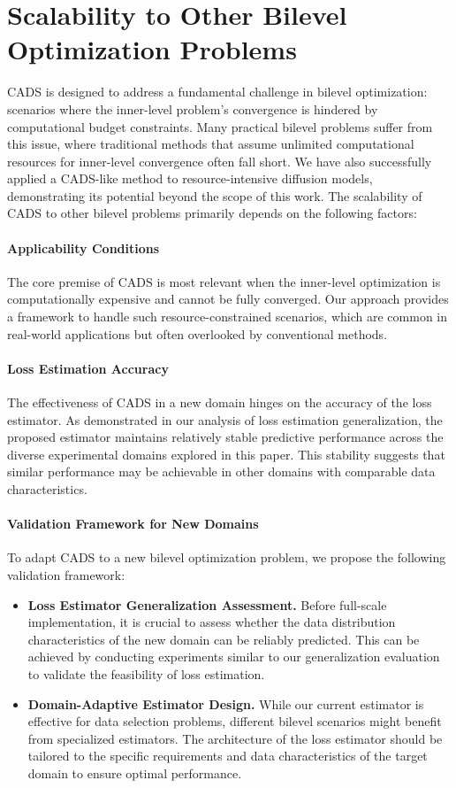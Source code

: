 \section{Scalability to Other Bilevel Optimization Problems}
\label{appendix:scala2other}
CADS is designed to address a fundamental challenge in bilevel optimization: scenarios where the inner-level problem's convergence is hindered by computational budget constraints. Many practical bilevel problems suffer from this issue, where traditional methods that assume unlimited computational resources for inner-level convergence often fall short. We have also successfully applied a CADS-like method to resource-intensive diffusion models, demonstrating its potential beyond the scope of this work. The scalability of CADS to other bilevel problems primarily depends on the following factors:

\paragraph{Applicability Conditions}
The core premise of CADS is most relevant when the inner-level optimization is computationally expensive and cannot be fully converged. Our approach provides a framework to handle such resource-constrained scenarios, which are common in real-world applications but often overlooked by conventional methods.

\paragraph{Loss Estimation Accuracy}
The effectiveness of CADS in a new domain hinges on the accuracy of the loss estimator. As demonstrated in our analysis of loss estimation generalization, the proposed estimator maintains relatively stable predictive performance across the diverse experimental domains explored in this paper. This stability suggests that similar performance may be achievable in other domains with comparable data characteristics.

\paragraph{Validation Framework for New Domains}
To adapt CADS to a new bilevel optimization problem, we propose the following validation framework:
\begin{itemize}
\item \textbf{Loss Estimator Generalization Assessment.} Before full-scale implementation, it is crucial to assess whether the data distribution characteristics of the new domain can be reliably predicted. This can be achieved by conducting experiments similar to our generalization evaluation to validate the feasibility of loss estimation.
\item \textbf{Domain-Adaptive Estimator Design.} While our current estimator is effective for data selection problems, different bilevel scenarios might benefit from specialized estimators. The architecture of the loss estimator should be tailored to the specific requirements and data characteristics of the target domain to ensure optimal performance.
\end{itemize}